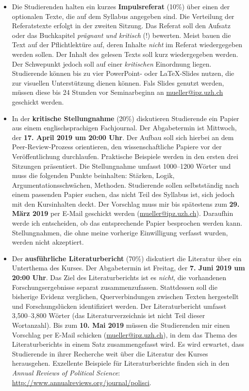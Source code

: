 \documentclass[abstract=on,parskip=full,headings=standardclasses,fontsize=11pt,paper=a4]{scrartcl}
\begin{document}
\begin{itemize}
\item Die Studierenden halten ein kurzes \textbf{Impulsreferat} (10\%)  über einen der optionalen Texte, die auf dem Syllabus angegeben sind. Die Verteilung der Referatstexte erfolgt in der zweiten Sitzung. Das Referat soll den Aufsatz oder das Buchkapitel \textit{prägnant und kritisch} (!) bewerten. Meist bauen die Text auf der Pflichtlektüre auf, deren Inhalte \textit{nicht} im Referat wiedergegeben werden sollen. Der Inhalt des gelesen Texts soll kurz wiedergegeben werden. Der Schwepunkt jedoch soll auf einer \textit{kritischen} Einordnung liegen.  Studierende können bis zu vier PowerPoint- oder LaTeX-Slides nutzen, die zur visuellen Unterstützung dienen können. Fals Slides genutzt werden, müssen diese bis 24 Stunden vor Seminarbeginn an \href{mailto:mueller@ipz.uzh.ch}{mueller@ipz.uzh.ch} geschickt werden. 

\item In der \textbf{kritische Stellungnahme} (20\%) diskutieren Studierende ein Papier aus einem englischsprachigen Fachjournal. Der Abgabetermin ist Mittwoch, der \textbf{17. April 2019 um 20:00 Uhr}.   Der Aufbau soll sich hierbei an dem Peer-Review-Prozess orientieren, den wissenschaftliche Papiere vor der Veröffentlichung durchlaufen. Praktische Beispiele werden in den ersten drei Sitzungen präsentiert. Die Stellungnahme umfasst 1000--1200 Wörter und  muss die folgenden Punkte beinhalten: Stärken, Logik, Argumentationsschwächen, Methoden. Studierende sollen selbstständig nach einem passenden Papier suchen, das nicht Teil des Syllabus ist, sich jedoch  mit den Kursinhalten deckt. Der Vorschlag muss mir bis spätestens zum \textbf{29. März 2019}  per E-Mail geschickt werden (\href{mailto:mueller@ipz.uzh.ch}{mueller@ipz.uzh.ch}). Daraufhin werde ich entscheiden, ob das entsprechende Papier besprochen werden kann. Stellungnahmen, die ohne meine vorherige Einwilligung verfasst wurden, werden nicht akzeptiert. 


\item Der \textbf{ausführliche Literaturbericht} (70\%) diskutiert die Literatur über ein Unterthema des Kurses. Der Abgabetermin ist Freitag, der \textbf{7. Juni 2019 um 20:00 Uhr}.  Das Ziel des Literaturberichts ist es \textit{nicht}, die vorhandenen Forschungsergebnisse separat  zusammenzufassen. Stattdessen soll die bisherige Evidenz verglichen,  Querverbindungen zwischen Texten hergestellt und Forschungslücken identifiziert werden. Der Literaturbericht umfasst 3,500--3,800 Wörter (das Literaturverzeichnis ist  nicht Teil dieser Wortanzahl). Bis zum \textbf{10. Mai 2019} müssen die Studierenden mir einen Vorschlag per E-Mail schicken (\href{mailto:mueller@ipz.uzh.ch}{mueller@ipz.uzh.ch}), in dem das Thema des Literaturberichts in einem Satz zusammengefasst wird. Es wird erwartet, dass Studierende in ihrer Recherche weit über die Literatur des Kurses herausgehen. Exzellente Beispiele für Literaturberichte finden sich in den \textit{Annual Reviews of Political Science}: \url{http://www.annualreviews.org/journal/polisci}.


\end{itemize}
\end{document}
